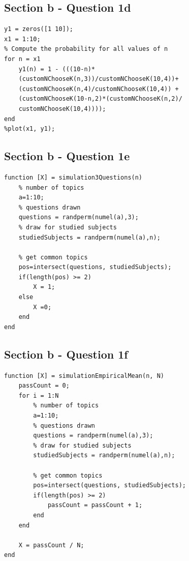\documentclass[14.5pt]{article}
\begin{document}
\subsection*{Section b - Question 1d}
\begin{lstlisting}
y1 = zeros([1 10]);
x1 = 1:10;
% Compute the probability for all values of n
for n = x1
    y1(n) = 1 - (((10-n)*
    (customNChooseK(n,3))/customNChooseK(10,4))+
    (customNChooseK(n,4)/customNChooseK(10,4)) + 
    (customNChooseK(10-n,2)*(customNChooseK(n,2)/
    customNChooseK(10,4))));
end
%plot(x1, y1);
\end{lstlisting}

\subsection*{Section b - Question 1e}
\begin{lstlisting}
function [X] = simulation3Questions(n)
    % number of topics
    a=1:10;
    % questions drawn
    questions = randperm(numel(a),3);
    % draw for studied subjects
    studiedSubjects = randperm(numel(a),n); 
    
    % get common topics
    pos=intersect(questions, studiedSubjects);
    if(length(pos) >= 2)
        X = 1; 
    else 
        X =0;
    end
end    
\end{lstlisting}

\subsection*{Section b - Question 1f}
\begin{lstlisting}
function [X] = simulationEmpiricalMean(n, N)
    passCount = 0;
    for i = 1:N
        % number of topics
        a=1:10;
        % questions drawn
        questions = randperm(numel(a),3);
        % draw for studied subjects
        studiedSubjects = randperm(numel(a),n); 

        % get common topics
        pos=intersect(questions, studiedSubjects);
        if(length(pos) >= 2)
            passCount = passCount + 1;
        end 
    end
    
    X = passCount / N;
end  
\end{lstlisting}
\end{document}
